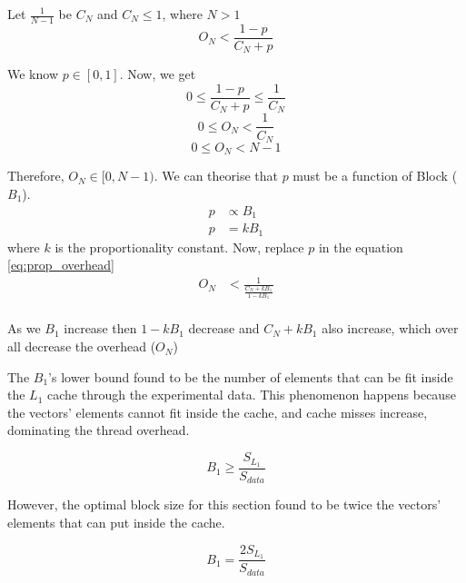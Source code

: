 Let $\frac{1}{N-1}$ be $C_N$ and $C_N \leq 1$, where $N > 1$
\begin{equation}
    O_N < \frac{1 - p}{ C_N + p }
    \label{eq:prop_overhead}
\end{equation}

We know $p \in [0,1]$. Now, we get
\[0 \leq \frac{1 - p}{ C_N + p } \leq \frac{1}{C_N}\]
\[0 \leq O_N < \frac{1}{C_N}\]
\[0 \leq O_N < N - 1\]

Therefore, $O_N \in [0,N-1)$. We can theorise that $p$ must be a function of Block ($B_1$).
\begin{align*}
    p &\propto B_1\\
    p &= kB_1
\end{align*}
where $k$ is the proportionality constant. Now, replace $p$ in the equation \ref{eq:prop_overhead}
\begin{align*}
    O_N &< \frac{1}{ \frac{C_N + kB_1}{1 - kB_1} }\\
\end{align*}

As we $B_1$ increase then $1 - kB_1$ decrease and $C_N + kB_1$ also increase, which over all decrease
the overhead ($O_N$)


The $B_1$'s lower bound found to be the number of elements that can be fit inside 
the $L_1$ cache through the experimental data. This phenomenon happens because 
the vectors' elements cannot fit inside the cache, and cache misses increase, 
dominating the thread overhead.

\[B_1 \geq \frac{S_{L_1}}{S_{data}}\]

However, the optimal block size for this section found to be twice 
the vectors' elements that can put inside the cache.

\begin{equation}
    B_1 = \frac{2S_{L_1}}{S_{data}}
    \label{eq:dot_block1}
\end{equation}

